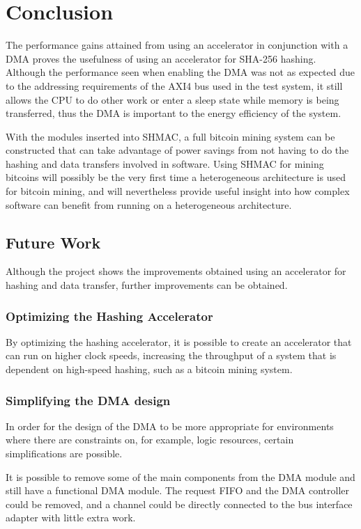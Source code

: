 \chapter{Conclusion}

The performance gains attained from using an accelerator in conjunction with a DMA
proves the usefulness of using an accelerator for SHA-256 hashing. Although the
performance seen when enabling the DMA was not as expected due to the addressing
requirements of the AXI4 bus used in the test system, it still allows the CPU to
do other work or enter a sleep state while memory is being transferred, thus
the DMA is important to the energy efficiency of the system.

With the modules inserted into SHMAC, a full bitcoin mining system can be
constructed that can take advantage of power savings from not having to do
the hashing and data transfers involved in software. Using SHMAC for mining
bitcoins will possibly be the very first time a heterogeneous architecture
is used for bitcoin mining, and will nevertheless provide useful insight
into how complex software can benefit from running on a heterogeneous
architecture.

\section{Future Work}
\label{sec:future-work}

Although the project shows the improvements obtained using an accelerator
for hashing and data transfer, further improvements can be obtained.

\subsection{Optimizing the Hashing Accelerator}
By optimizing the hashing accelerator, it is possible to create an accelerator
that can run on higher clock speeds, increasing the throughput of a system that
is dependent on high-speed hashing, such as a bitcoin mining system.

\subsection{Simplifying the DMA design} 
In order for the design of the DMA to be more appropriate for environments where
there are constraints on, for example, logic resources, certain simplifications
are possible.

It is possible to remove some of the main components from the DMA module and still
have a functional DMA module. The request FIFO and the DMA controller could be removed,
and a channel could be directly connected to the bus interface adapter with little
extra work.

